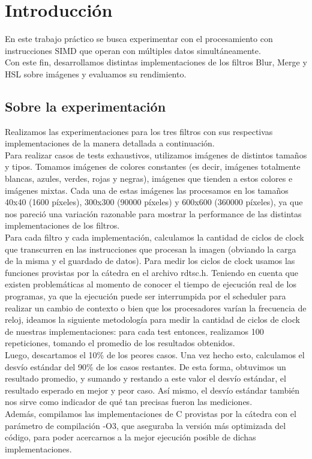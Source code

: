 \section{Introducción}
En este trabajo práctico se busca experimentar con el procesamiento con instrucciones SIMD que operan con múltiples datos simultáneamente.\\ 
Con este fin, desarrollamos distintas implementaciones de los filtros Blur, Merge y HSL sobre imágenes y evaluamos su rendimiento.\\
\subsection{Sobre la experimentación}
Realizamos las experimentaciones para los tres filtros con sus respectivas implementaciones de la manera detallada a continuación.\\
Para realizar casos de tests exhaustivos, utilizamos imágenes de distintos tamaños y tipos.
Tomamos imágenes de colores constantes (es decir, imágenes totalmente blancas, azules, verdes, rojas y negras), imágenes que tienden a estos colores e imágenes mixtas.
Cada una de estas imágenes las procesamos en los tamaños 40x40 (1600 píxeles), 300x300 (90000 píxeles) y 600x600 (360000 píxeles), ya que nos pareció una variación razonable para mostrar la performance de las distintas implementaciones de los filtros.\\
Para cada filtro y cada implementación, calculamos la cantidad de ciclos de clock que transcurren en las instrucciones que procesan la imagen (obviando la carga de la misma y el guardado de datos). Para medir los ciclos de clock usamos las funciones provistas por la cátedra en el archivo rdtsc.h. 
Teniendo en cuenta que existen problemáticas al momento de conocer el tiempo de ejecución real de los programas, ya que la ejecución puede ser interrumpida por el scheduler para realizar un cambio de contexto o bien que los procesadores varían la frecuencia de reloj, ideamos la siguiente metodología para medir la cantidad de ciclos de clock de nuestras implementaciones: para cada test entonces, realizamos 100 repeticiones, tomando el promedio de los resultados obtenidos.\\ Luego, descartamos el 10\% de los peores casos. Una vez hecho esto, calculamos el desvío estándar del 90\% de los casos restantes. De esta forma, obtuvimos un resultado promedio, y sumando y restando a este valor el desvío estándar, el resultado esperado en mejor y peor caso. Así mismo, el desvío estándar también nos sirve como indicador de qué tan precisas fueron las mediciones.\\
Además, compilamos las implementaciones de C provistas por la cátedra con el parámetro de compilación -O3, que aseguraba la versión más optimizada del código, para poder acercarnos a la mejor ejecución posible de dichas implementaciones.\\

